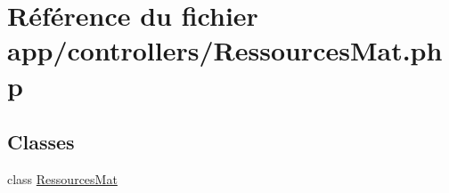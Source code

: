 \hypertarget{_ressources_mat_8php}{}\section{Référence du fichier app/controllers/\+Ressources\+Mat.php}
\label{_ressources_mat_8php}
\subsection*{Classes}
\begin{DoxyCompactItemize}
\item 
class \hyperlink{class_ressources_mat}{Ressources\+Mat}
\end{DoxyCompactItemize}
